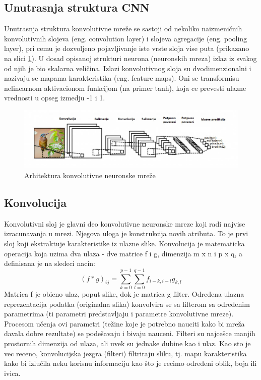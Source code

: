 \documentclass[a4paper]{article}
\begin{document}
\subsection{Unutrasnja struktura CNN}

Unutrasnja struktura konvolutivne mreže se sastoji od nekoliko naizmeničnih konvolutivnih slojeva (eng. convolution layer) i slojeva agregacije (eng. pooling layer), pri cemu je dozvoljeno pojavljivanje iste vrste sloja vise puta (prikazano na slici \ref{fig:cnn_layers}). U dosad opisanoj strukturi neurona (neuronskih mreza) izlaz iz svakog od njih je bio skalarna veličina. Izlazi konvolutivnog sloja su dvodimenzionalni i nazivaju se mapama karakteristika (eng. feature maps). Oni se transformisu nelinearnom aktivacionom funkcijom (na primer tanh), koja ce prevesti ulazne vrednosti u opseg izmedju -1 i 1.




\begin{figure}[h!]
\begin{center}
\includegraphics[scale=0.62]{cnn_layers.jpg}
\end{center}
\caption{Arhitektura konvolutivne neuronske mreže}
\label{fig:cnn_layers}
\end{figure}


\subsection{Konvolucija}
\label{konvolucija}

Konvolutivni sloj je glavni deo konvolutivne neuronske mreze koji radi najvise izracunavanja u mrezi. Njegova uloga je konstrukcija novih atributa. To je prvi sloj koji ekstraktuje karakteristike iz ulazne slike. Konvolucija je matematicka operacija koja uzima dva ulaza - dve matrice f i g, dimenzija m x n i p x q, a definisana je na sledeci nacin:
$$(f * g)_{ij} = \sum_{k=0}^{p-1} \sum_{l=0}^{q-1} f_{i-k, i-l}g_{k, l}$$
Matrica f je obicno ulaz, poput slike, dok je matrica g filter. Određena ulazna reprezentacija podatka (originalna slika) konvolvira se sa filterom sa određenim parametrima (ti parametri predstavljaju i parametre konvolutivne mreze). Procesom učenja ovi parametri (težine koje je potrebno nauciti kako bi mreža davala dobre rezultate) se podešavaju i bivaju nauceni. Filteri su najcešce manjih prostornih dimenzija od ulaza, ali uvek su jednake dubine kao i ulaz. Kao sto je vec receno, konvolucijska jezgra (filteri) filtriraju sliku, tj. mapu karakteristika kako bi izlučila neku korisnu informaciju kao što je recimo određeni oblik, boja ili ivica.
\end{document}
